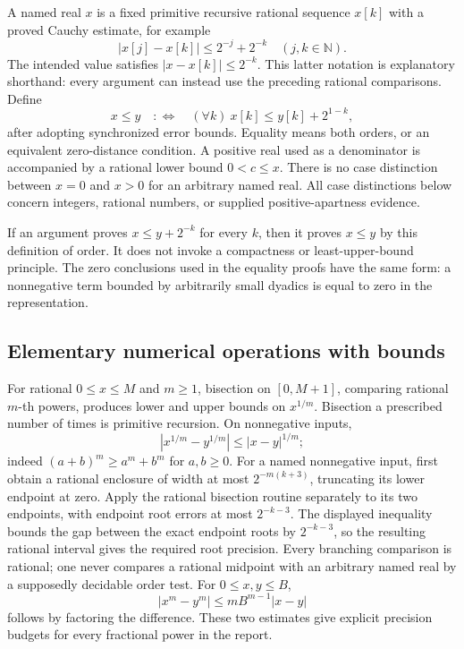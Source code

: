A named real \(x\) is a fixed primitive recursive rational sequence
\(x[k]\) with a proved Cauchy estimate, for example
\[
 |x[j]-x[k]|\leq 2^{-j}+2^{-k}\quad(j,k\in\mathbb N).
\]
The intended value satisfies \(|x-x[k]|\leq2^{-k}\). This latter notation
is explanatory shorthand: every argument can instead use the preceding
rational comparisons. Define
\[
 x\leq y\quad:\Longleftrightarrow\quad
 (\forall k)\ x[k]\leq y[k]+2^{1-k},
\]
after adopting synchronized error bounds. Equality means both orders,
or an equivalent zero-distance condition. A positive real used as a
denominator is accompanied by a rational lower bound \(0<c\leq x\).
There is no case distinction between \(x=0\) and \(x>0\) for an arbitrary
named real. All case distinctions below concern integers, rational numbers,
or supplied positive-apartness evidence.

If an argument proves \(x\leq y+2^{-k}\) for every \(k\), then it proves
\(x\leq y\) by this definition of order. It does not invoke a compactness
or least-upper-bound principle. The zero conclusions used in the equality
proofs have the same form: a nonnegative term bounded by arbitrarily small
dyadics is equal to zero in the representation.

\subsection{Elementary numerical operations with bounds}

For rational \(0\leq x\leq M\) and \(m\geq1\), bisection on
\([0,M+1]\), comparing rational \(m\)-th powers, produces lower and
upper bounds on \(x^{1/m}\). Bisection a prescribed number of times is
primitive recursion. On nonnegative inputs,
\[
 |x^{1/m}-y^{1/m}|\leq |x-y|^{1/m};
\]
indeed \((a+b)^m\geq a^m+b^m\) for \(a,b\geq0\). For a named
nonnegative input, first obtain a rational enclosure of width at most
\(2^{-m(k+3)}\), truncating its lower endpoint at zero. Apply the
rational bisection routine separately to its two endpoints, with endpoint
root errors at most \(2^{-k-3}\). The displayed inequality bounds the
gap between the exact endpoint roots by \(2^{-k-3}\), so the resulting
rational interval gives the required root precision. Every branching
comparison is rational; one never compares a rational midpoint with an
arbitrary named real by a supposedly decidable order test.
For \(0\leq x,y\leq B\),
\[
 |x^m-y^m|\leq mB^{m-1}|x-y|
\]
follows by factoring the difference. These two estimates give explicit
precision budgets for every fractional power in the report.

